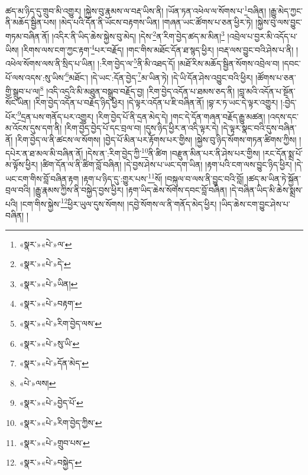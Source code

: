 ཚད་མ་ཉིད་དུ་གྲུབ་མི་འགྱུར། །སྐྱེས་བུ་རྣམས་ལ་བརྡ་ཡིས་ནི། །ཡོན་ཏན་འཕེལ་ལ་སོགས་པ་\footnote{«སྣར་»«པེ་»ལ་}བཞིན། །རྒྱུ་མེད་ཀྱང་ནི་མཆོད་སྦྱིན་པས། །མེད་པའི་དོན་ནི་ཡོངས་བརྟགས་ཡིན། །གཞན་ཡང་ཚོགས་པ་ཅན་ཕྱིར་ཏེ། །སྐྱེས་བུ་ལས་བྱུང་གཏམ་བཞིན་ནོ། །འདིར་ནི་ཡིད་ཆེས་སྐྱེས་བུ་མེད། །དེས་\footnote{«སྣར་»«པེ་»དེ་}ན་རིག་བྱེད་ཚད་མ་མིན།\footnote{«སྣར་»«པེ་»ཡིན།} །འབྲེལ་པ་བྱར་མི་འདོད་པ་ཡིས། །རིགས་ལས་ངག་ཀྱང་རྟག་\footnote{«སྣར་»«པེ་»བརྟག་}པར་བརྗོད། །གང་གིས་མཐོང་དོན་ཐ་སྙད་ཕྱིར། །བརྡ་ལས་བྱུང་བའི་ཤེས་པ་ནི། །འཕེལ་སོགས་ལས་ནི་སྲིད་པ་ཡིན། །:རིག་བྱེད་ལ་\footnote{«སྣར་»«པེ་»རིག་བྱེད་ལས་}ནི་མི་འཐད་དོ། །མཐོ་རིས་མཆོད་སྦྱིན་སོགས་འབྲེལ་བ། །དབང་པོ་ལས་འདས་:སུ་ཡིས་\footnote{«སྣར་»«པེ་»སུ་ཡི་}མཐོང་། །དེ་ཡང་:དོན་བྱེད་\footnote{«སྣར་»«པེ་»དོན་མེད་}མ་ཡིན་ཏེ། །དེ་ཡི་དོན་ཤེས་འབྱུང་བའི་ཕྱིར། །ཚོགས་པ་ཅན་གྱི་སྒྲུབ་པ་ལ།\footnote{«པེ་»ལས།} །འདི་འདྲའི་མི་མཐུན་བསྒྲུབ་བརྗོད་བྱ། །རིག་བྱེད་འདོན་པ་ཐམས་ཅད་ནི། །བླ་མའི་འདོན་པ་སྔོན་སོང་ཡིན། །རིག་བྱེད་འདོན་པ་བརྗོད་ཉིད་ཕྱིར། །དེ་ལྟར་འདོན་པ་ཇི་བཞིན་ནོ། །བྷ་ར་ཏ་ཡང་དེ་ལྟར་འགྱུར། །:བྱེད་པོར་\footnote{«སྣར་»«པེ་»བྱེད་པོ་}དྲན་པས་གནོད་པར་འགྱུར། །རིག་བྱེད་པོ་ནི་དྲན་མེད་དེ། །གང་དེ་དོན་གཞན་བརྗོད་རྒྱུ་མཚན། །འདས་དང་མ་འོངས་དུས་དག་ནི། །རིག་བྱེད་བྱེད་པོ་དང་བྲལ་བ། །དུས་ཉིད་ཕྱིར་ན་འདི་ལྟར་དེ། །དེ་ལྟར་སྣང་བའི་དུས་བཞིན་ནོ། །རིག་བྱེད་ལ་ནི་ཚངས་ལ་སོགས། །བྱེད་པོ་མིན་པར་རྟོགས་པར་གྱིས། །སྐྱེས་བུ་ཉིད་སོགས་གཏན་ཚིགས་ཀྱིས། །དཔེར་ན་ཐ་མལ་མི་བཞིན་ནོ། །དེས་ན་:རིག་བྱེད་ཀྱི་\footnote{«སྣར་»«པེ་»རིག་བྱེད་ཀྱིས་}ནི་ཚིག །བརྫུན་མིན་པར་ནི་ཤེས་པར་གྱིས། །རང་དོན་སྨྲ་པོ་མ་ལྟོས་ཕྱིར། །ཚིག་དོན་ལ་ནི་ཚིག་བློ་བཞིན། །དེ་བྱས་ཤེས་པ་ཡང་དག་ཡིན། །རྟག་པའི་ངག་ལས་བྱུང་ཉིད་ཕྱིར། །དེ་ཡང་ངག་གིས་བློ་བཞིན་རྟག །རྟག་པ་ཉིད་དུ་:གྱུར་པས་\footnote{«སྣར་»«པེ་»གྲུབ་པས་}སོ། །བསྐུལ་བ་ལས་ནི་བྱུང་བའི་བློ། །ཚད་མ་ཡིན་ཏེ་སྐྱོན་བྲལ་བའི། །རྒྱུ་རྣམས་ཀྱིས་ནི་བསྐྱེད་བྱས་ཕྱིར། །རྟག་ཡིད་ཆེས་སོགས་དབང་བློ་བཞིན། །དེ་བཞིན་ཡིད་མི་ཆེས་སྨྲས་པའི། །ངག་གིས་སྐྱེས་\footnote{«སྣར་»«པེ་»བསྐྱེད་}ཕྱིར་ཡུལ་དུས་སོགས། །དབྱེ་སོགས་ལ་ནི་གནོད་མེད་ཕྱིར། །ཡིད་ཆེས་ངག་བྱུང་ཤེས་པ་བཞིན། །
